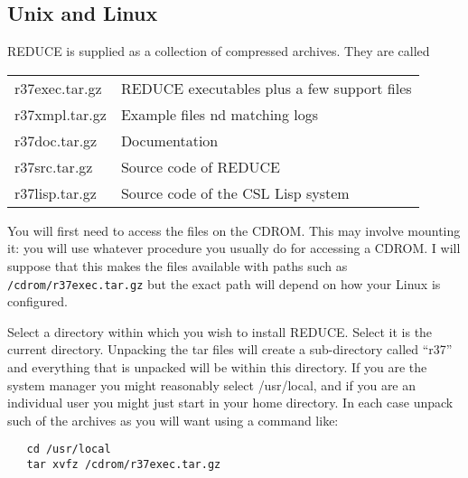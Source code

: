 \documentclass[a4paper,11pt]{article}
\begin{document}
\subsection{Unix and Linux}
REDUCE is supplied as a collection of compressed archives. They are called
\begin{tabular}{ll}
{\ttfamily r37exec.tar.gz}   & REDUCE executables plus a few support files \\
{\ttfamily r37xmpl.tar.gz}   & Example files nd matching logs \\
{\ttfamily r37doc.tar.gz}    & Documentation \\
{\ttfamily r37src.tar.gz}    & Source code of REDUCE \\
{\ttfamily r37lisp.tar.gz}   & Source code of the CSL Lisp system \\
\end{tabular}

You will first need to access the files on the CDROM. This may involve
mounting it: you will use whatever procedure you usually do for accessing
a CDROM. I will suppose that this makes the files available with paths
such as \verb+/cdrom/r37exec.tar.gz+ but the exact path will depend on how
your Linux is configured.

Select a directory within which you wish to install REDUCE. Select
it is the current directory. Unpacking the tar files will create a
sub-directory called ``r37'' and everything that is unpacked will be 
within this directory. If you are the system manager you might reasonably 
select {\ttfamily /usr/local}, and if you are an individual user you might
just start in your home directory.  In each case unpack such of the 
archives as you will want using a command like:
\begin{verbatim}
   cd /usr/local
   tar xvfz /cdrom/r37exec.tar.gz
\end{verbatim}
\end{document}
